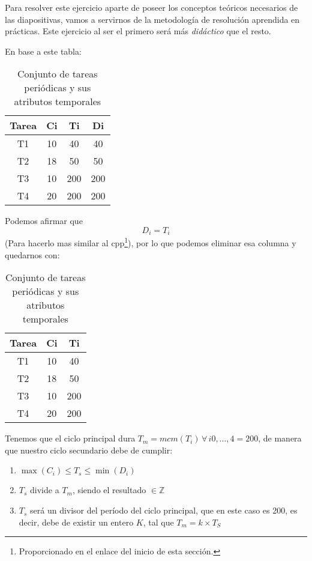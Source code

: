 \documentclass[a4paper,12pt]{article}
\begin{document}
Para resolver este ejercicio aparte de poseer los conceptos teóricos necesarios de las diapositivas, vamos a servirnos de la metodología de resolución aprendida en prácticas. Este ejercicio al ser el primero será más \textit{didáctico} que el resto.

En base a este tabla:

\begin{table}[H]
    \centering
    \begin{tabular}{|c|c|c|c|}
    \hline
    \textbf{Tarea} & \textbf{Ci} & \textbf{Ti} & \textbf{Di} \\ \hline
    T1 & 10 & 40 & 40 \\ \hline
    T2 & 18 & 50 & 50 \\ \hline
    T3 & 10 & 200 & 200 \\ \hline
    T4 & 20 & 200 & 200 \\ \hline
    \end{tabular}
    \caption{Conjunto de tareas periódicas y sus atributos temporales}
\end{table}

Podemos afirmar que \[D_i = T_i \] (Para hacerlo mas similar al cpp\footnote{Proporcionado en el enlace del inicio de esta sección.}),  por lo que podemos eliminar esa columna y quedarnos con:

\begin{table}[H]
    \centering
    \begin{tabular}{|c|c|c|}
    \hline
    \textbf{Tarea} & \textbf{Ci} & \textbf{Ti} \\ \hline
    T1 & 10 & 40 \\ \hline
    T2 & 18 & 50 \\ \hline
    T3 & 10 & 200 \\ \hline
    T4 & 20 & 200 \\ \hline
    \end{tabular}
    \caption{Conjunto de tareas periódicas y sus atributos temporales}
\end{table}

Tenemos que el ciclo principal dura $T_m = mcm(T_i)\,\forall \, i 0,\ldots, 4 = 200$, de manera que nuestro ciclo secundario debe de cumplir:
\begin{enumerate}
    \item $\max(C_i) \leq T_s \leq \min(D_i)$
    \item $T_s$ divide a $T_m$, siendo el resultado $\in \mathbb{Z}$
    \item $T_s$ será un divisor del período del ciclo principal, que en este caso es 200, es decir, debe de existir un entero $K$, tal que $T_m = k \times T_S$
\end{enumerate}
\end{document}
